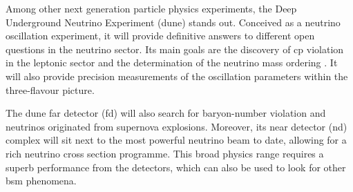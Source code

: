 Among other next generation particle physics experiments, the Deep Underground Neutrino Experiment (\gls{dune}) stands out. Conceived as a neutrino oscillation experiment, it will provide definitive answers to different open questions in the neutrino sector. Its main goals are the discovery of \gls{cp} violation in the leptonic sector and the determination of the neutrino mass ordering \cite{DUNE2020TDR1}. It will also provide precision measurements of the oscillation parameters within the three-flavour picture.

The \gls{dune} far detector (\gls{fd}) will also search for baryon-number violation and neutrinos originated from supernova explosions. Moreover, its near detector (\gls{nd}) complex will sit next to the most powerful neutrino beam to date, allowing for a rich neutrino cross section programme. This broad physics range requires a superb performance from the detectors, which can also be used to look for other \gls{bsm} phenomena.

\begin{comment}
In this thesis, I explore three different aspects of \gls{dune}. Focusing on the data acquisition system of the far detector, I start by proposing a method to enhance the sensitivity of the online processing to low energy events. The idea is to modify the processing chain in order to have more information available to form trigger decisions. I motivate this new approach using both ProtoDUNE data and Monte Carlo (MC) samples, as well as with the results from a test in a real detector setup.

Then, I investigate the potential of detecting neutrino fluxes from \gls{dm} annihilations inside the Sun with \gls{dune}. Although this is the territory of the large volume neutrino telescopes, a detector with the high resolution and pointing capabilities of the \gls{dune} \gls{fd} can provide complementary information in certain regimes. I present here the results of a preliminary analysis, showing the projected sensitivities for the general case and two particular \gls{dm} scenarios.

Finally, I discuss my work on the reconstruction of \gls{ndgar}, the gaseous argon component of the \gls{dune} \gls{nd}. These efforts were focused towards the development of the particle identification strategy in the detector. Following a series of additions and upgrades in the reconstruction, I make use of that to perform the first event selection studies with fully reconstructed events in this detector.
\end{comment}

